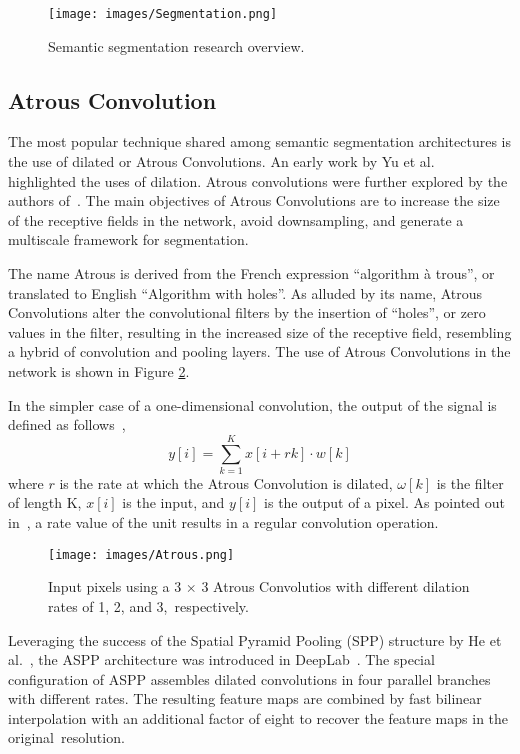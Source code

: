 \documentclass[sensors,article,accept,moreauthors,pdftex]{Definitions/mdpi}
\begin{document}
\begin{figure}[H]
\centering
\texttt{[image: images/Segmentation.png]}
\caption{Semantic segmentation research overview.}   \label{fig:Segmentation}
\end{figure}

\subsection{Atrous Convolution}
The most popular technique shared among semantic segmentation architectures is the use of dilated or Atrous Convolutions. An early work by Yu et al.~\cite{DilatedConv} highlighted the uses of dilation.
Atrous convolutions were further explored by the authors of~\cite{DeepLab,Rethinking,DeepLabv3+,Enet}. The main objectives of Atrous Convolutions are to increase the size of the receptive fields in the network, avoid downsampling, and generate a multiscale framework for segmentation.

The name Atrous is derived from the French expression ``algorithm \`a trous'', or translated to English ``Algorithm with holes''. As alluded by its name, Atrous Convolutions alter the convolutional filters by the insertion of ``holes'', or zero values in the filter, resulting in the increased size of the receptive field, resembling a hybrid of convolution and pooling layers.
The use of Atrous Convolutions in the network is shown in Figure \ref{fig:Atrous}.

In the simpler case of a one-dimensional convolution, the output of the signal is defined as follows~\cite{DeepLab},
\begin{equation}
y[i]=\sum_{k=1}^{K}x[i+rk]\cdot w[k]
\end{equation}
where $r$ is the rate at which the Atrous Convolution is dilated, $\omega[k]$ is the filter of length K, $x[i]$ is the input, and $y[i]$ is the output of a pixel. As pointed out in~\cite{DeepLab}, a rate value of the unit results in a regular convolution operation.

\begin{figure}[H]
\centering
\texttt{[image: images/Atrous.png]}
\caption{Input pixels using a 3 $\times$ 3 Atrous Convolutios with different dilation rates of 1, 2, and 3,~respectively.}
\label{fig:Atrous}
\end{figure}

Leveraging the success of the Spatial Pyramid Pooling (SPP) structure by He et al.~\cite{SPP}, the ASPP architecture was introduced in DeepLab~\cite{DeepLab}.
The special configuration of ASPP assembles dilated convolutions in four parallel branches with different rates. The resulting feature maps are combined by fast bilinear interpolation with an additional factor of eight to recover the feature maps in the original~resolution.
\end{document}
